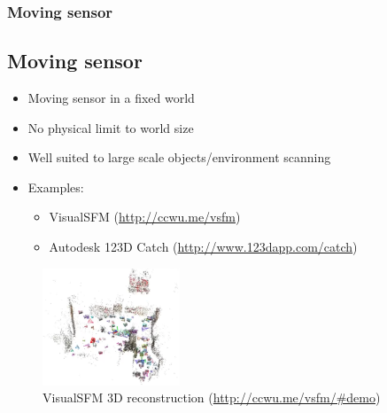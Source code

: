 \documentclass[10pt,serif,t]{beamer}
\newenvironment{SubSlide}[1]
{
  \begin{frame}[fragile,environment=SubSlide]
    \frametitle{#1}
    \subsection{#1}
  }
  {
  \end{frame}
}
\begin{document}
\begin{SubSlide}{Moving sensor}
  \begin{itemize}
    \item
      Moving sensor in a fixed world

    \item
      No physical limit to world size

    \item
      Well suited to large scale objects/environment scanning

      \vspace{1em}

      \pause

    \item
      Examples:

      \begin{itemize}
        \item
          VisualSFM (\url{http://ccwu.me/vsfm})

        \item
          Autodesk 123D Catch (\url{http://www.123dapp.com/catch})

      \end{itemize}

  \end{itemize}

  \pause

  \begin{figure}
    \centering
    \includegraphics[height=3.5cm]{graphics/VisualSFM_Demo.eps}
    \caption{VisualSFM 3D reconstruction (\url{http://ccwu.me/vsfm/\#demo})}
    \label{fig:VisualSFM_Demo}
  \end{figure}
\end{SubSlide}
\end{document}
